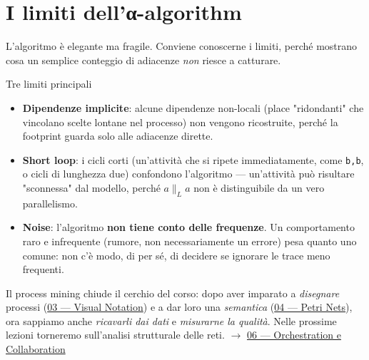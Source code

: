 \section{\texorpdfstring{I limiti dell'α-algorithm}{I limiti dell'α-algorithm}}

L'algoritmo è elegante ma fragile. Conviene conoscerne i limiti, perché mostrano cosa un semplice conteggio di adiacenze \emph{non} riesce a catturare.

\begin{boxwarning}{Tre limiti principali}
\begin{itemize}
\item \textbf{Dipendenze implicite}: alcune dipendenze non-locali (place "ridondanti" che vincolano scelte lontane nel processo) non vengono ricostruite, perché la footprint guarda solo alle adiacenze dirette.
\item \textbf{Short loop}: i cicli corti (un'attività che si ripete immediatamente, come \texttt{b,b}, o cicli di lunghezza due) confondono l'algoritmo — un'attività può risultare "sconnessa" dal modello, perché $a \parallel_L a$ non è distinguibile da un vero parallelismo.
\item \textbf{Noise}: l'algoritmo \textbf{non tiene conto delle frequenze}. Un comportamento raro e infrequente (rumore, non necessariamente un errore) pesa quanto uno comune: non c'è modo, di per sé, di decidere se ignorare le trace meno frequenti.
\end{itemize}
\end{boxwarning}

Il process mining chiude il cerchio del corso: dopo aver imparato a \emph{disegnare} processi (\hyperref[ch:03]{03 — Visual Notation}) e a dar loro una \emph{semantica} (\hyperref[ch:04]{04 — Petri Nets}), ora sappiamo anche \emph{ricavarli dai dati} e \emph{misurarne la qualità}. Nelle prossime lezioni torneremo sull'analisi strutturale delle reti. $\rightarrow$ \hyperref[ch:06]{06 — Orchestration e Collaboration}